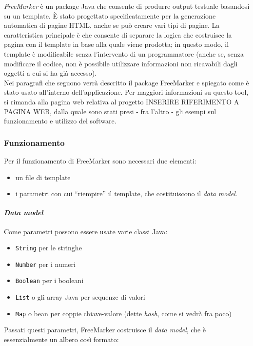 
\textsl{FreeMarker} è un package Java che consente di produrre output testuale basandosi su un template. È stato progettato specificatamente per la generazione automatica di pagine HTML, anche se può creare vari tipi di pagine. La caratteristica principale è che consente di separare la logica che costruisce la pagina con il template in base alla quale viene prodotta; in questo modo, il template è modificabile senza l'intervento di un programmatore (anche se, senza modificare il codice, non è possibile utilizzare informazioni non ricavabili dagli oggetti a cui si ha già accesso).\\
Nei paragrafi che seguono verrà descritto il package FreeMarker e spiegato come è stato usato all'interno dell'applicazione. Per maggiori informazioni su questo tool, si rimanda alla pagina web relativa al progetto INSERIRE RIFERIMENTO A PAGINA WEB, dalla quale sono stati presi - fra l'altro - gli esempi sul funzionamento e utilizzo del software.


\subsubsection{Funzionamento}
Per il funzionamento di FreeMarker sono necessari due elementi:
\begin{itemize}
\item un file di template
\item i parametri con cui \textquotedblleft riempire\textquotedblright{} il template, che costituiscono il \textit{data model}.
\end{itemize}

\paragraph{\textit{Data model}}
Come parametri possono essere usate varie classi Java:

\begin{itemize}
\item \lstinline{String} per le stringhe
\item \lstinline{Number} per i numeri
\item \lstinline{Boolean} per i booleani
\item \lstinline{List} o gli array Java per sequenze di valori
\item \lstinline{Map} o bean per coppie chiave-valore (dette \textsl{hash}, come si vedrà fra poco)
\end{itemize}

Passati questi parametri, FreeMarker costruisce il \textit{data model}, che è essenzialmente un albero così formato:

